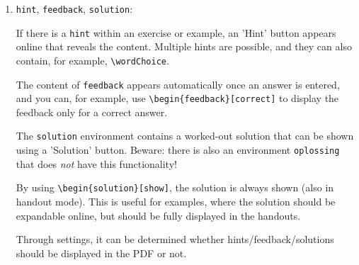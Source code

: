 \documentclass{ximera}
\begin{document}
\begin{enumerate}
    These problem environments function as the above, but they can also contain commands and other environments that generate online interactive components on which \textit{answers} can be entered. These answers are sent to the Ximera server, allowing for the creation of reports and analyses.

    In the PDF, either the correct answers are shown directly, or drop-down menus or input points are shown (depending on options that are enabled or disabled during compilation).

    Use \verb|example| for examples, and \verb|exercise| for exercises.
    The environments \verb|problem| and \verb|exploration| are currently not used or rarely used.

    The \verb|question| environment is modified to have a minimal header with only a number. In practice, it is used within an exercise or example as an alternative to \verb|itemize| or \verb|enumerate|.

    Answers can be requested within these environments using commands like \verb|\answer| or \verb|\wordChoice|. Hints, feedback, and solutions are also possible.

    \item \verb|hint|, \verb|feedback|, \verb|solution|:

    If there is a \verb|hint| within an exercise or example, an 'Hint' button appears online that reveals the content. Multiple hints are possible, and they can also contain, for example, \verb|\wordChoice|.

    The content of \verb|feedback| appears automatically once an answer is entered, and you can, for example, use \verb|\begin{feedback}[correct]| to display the feedback only for a correct answer.

    The \verb|solution| environment contains a worked-out solution that can be shown using a 'Solution' button. Beware: there is also an environment \verb|oplossing| that does \textit{not} have this functionality!

    By using \verb|\begin{solution}[show]|, the solution is always shown (also in handout mode). This is useful for examples, where the solution should be expandable online, but should be fully displayed in the handouts.

    Through settings, it can be determined whether hints/feedback/solutions should be displayed in the PDF or not.


\end{enumerate}
\end{document}
